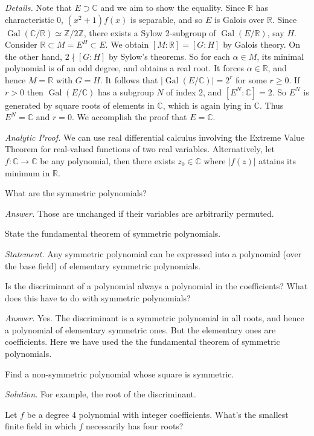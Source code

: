 \documentclass{mathproblems}
\newcommand\R{\mathbb{R}}
\newcommand\C{\mathbb{C}}
\newcommand\Z{\mathbb{Z}}
\newcommand\al{\alpha}
\DeclareMathOperator{\Gal}{Gal}
\begin{document}
\begin{questions}
{\color{teal}
\textit{Details.} Note that $E\supset \C$ and we aim to show the equality. Since $\R$ has characteristic 0, $(x^2+1)f(x)$ is separable, and so $E$ is Galois over $\R$. Since $\Gal(\C/\R)\simeq \Z/2\Z$, there exists a Sylow 2-subgroup of $\Gal(E/\R)$, say $H$. Consider $\R\subset M=E^H\subset E$. We obtain $[M:\R]=[G:H]$ by Galois theory. On the other hand, $2\nmid [G:H]$ by Sylow's theorems. So for each $\al\in M$, its minimal polynomial is of an odd degree, and obtains a real root. It forces $\al\in \R$, and hence $M=\R$ with $G=H$. It follows that $|\Gal(E/\C)|=2^r$ for some $r\geqslant 0$. If $r>0$ then $\Gal(E/\C)$ has a subgroup $N$ of index 2, and $[E^N:\C]=2$. So $E^N$ is generated by square roots of elements in $\C$, which is again lying in $\C$. Thus $E^N=\C$ and $r=0$. We accomplish the proof that $E=\C$.}


\textit{Analytic Proof.} We can use real differential calculus involving the Extreme Value Theorem for real-valued functions of two real variables. Alternatively, let $f:\C\to \C$ be any polynomial, then there exists $z_0\in\C$ where $|f(z)|$ attains its minimum in $\R$.


\miquestion
{\color{blue} What are the symmetric polynomials?}

\textit{Answer.} Those are unchanged if their variables are arbitrarily permuted.

\miquestion
{\color{blue} State the fundamental theorem of symmetric polynomials.}

\textit{Statement.} Any symmetric polynomial can be expressed into a polynomial (over the base field) of elementary symmetric polynomials.

\miquestion
{\color{blue} Is the discriminant of a polynomial always a polynomial in the coefficients? What does this have to do with symmetric polynomials?}

\textit{Answer.} Yes. The discriminant is a symmetric polynomial in all roots, and hence a polynomial of elementary symmetric ones. But the elementary ones are coefficients. Here we have used the the fundamental theorem of symmetric polynomials.

\miquestion
{\color{blue} Find a non-symmetric polynomial whose square is symmetric.}

\textit{Solution.} For example, the root of the discriminant.

\miquestion
{\color{blue} Let $f$ be a degree 4 polynomial with integer coefficients. What's the smallest finite field in which $f$ necessarily has four roots?}


\end{questions}
\end{document}
